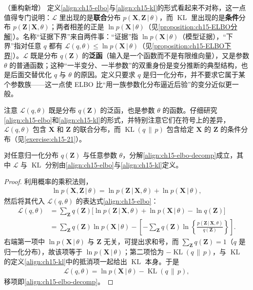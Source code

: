 \documentclass[../../main.tex]{subfiles}
\begin{document}
\begin{remark}（重构新增）
定义\eqref{align:ch15-elbo}与\eqref{align:ch15-kl}的形式看起来不对称，这一点值得专门说明：$\mathcal{L}$ 里出现的是\textbf{联合}分布 $p(\bm{X},\bm{Z}\,|\,\theta)$，而 $\operatorname{KL}$ 里出现的是\textbf{条件}分布 $p(\bm{Z}\,|\,\bm{X},\theta)$；两者相差的正是 $\ln p(\bm{X}\,|\,\theta)$（见\cref{proposition:ch15-ELBO分解}）。名称“证据下界”来自两件事：“证据”指 $\ln p(\bm{X}\,|\,\theta)$（模型证据），“下界”指对任意 $q$ 都有 $\mathcal{L}(q,\theta)\leqslant\ln p(\bm{X}\,|\,\theta)$（见\cref{proposition:ch15-ELBO下界}）。$\mathcal{L}$ 既是分布 $q(\bm{Z})$ 的\textbf{泛函}（输入是一个函数而不是有限维向量），又是参数 $\theta$ 的普通函数；这种“一半变分、一半参数”的双重身份是变分推断的典型结构，也是后面交替优化 $q$ 与 $\theta$ 的原因。定义只要求 $q$ 是归一化分布，并不要求它属于某个参数族——这一点使 ELBO 比“用一族参数化分布逼近后验”的变分近似更一般。
\end{remark}

注意 $\mathcal{L}(q,\theta)$ 既是分布 $q(\bm{Z})$ 的泛函，也是参数 $\theta$ 的函数。仔细研究\eqref{align:ch15-elbo}和\eqref{align:ch15-kl}的形式，并特别注意它们在符号上的差异，$\mathcal{L}(q,\theta)$ 包含 $\bm{X}$ 和 $\bm{Z}$ 的联合分布，而 $\operatorname{KL}(q\,\|\,p)$ 包含给定 $\bm{X}$ 的 $\bm{Z}$ 的条件分布（见\cref{exercise:ch15-21}）。

\begin{proposition}[ELBO 分解]\label{proposition:ch15-ELBO分解}
对任意归一化分布 $q(\bm{Z})$ 与任意参数 $\theta$，分解\eqref{align:ch15-elbo-decomp}成立，其中 $\mathcal{L}$ 与 $\operatorname{KL}$ 分别由\eqref{align:ch15-elbo}与\eqref{align:ch15-kl}定义。
\end{proposition}
\begin{proof}
利用概率的乘积法则，
\begin{align}
\ln p(\bm{X},\bm{Z}\,|\,\theta)=\ln p(\bm{Z}\,|\,\bm{X},\theta)+\ln p(\bm{X}\,|\,\theta),
\label{align:ch15-product-rule}
\end{align}
然后将其代入 $\mathcal{L}(q,\theta)$ 的表达式\eqref{align:ch15-elbo}：
\begin{align*}
\mathcal{L}(q,\theta)
&=\sum_{\bm{Z}}q(\bm{Z})\Big[\ln p(\bm{Z}\,|\,\bm{X},\theta)+\ln p(\bm{X}\,|\,\theta)-\ln q(\bm{Z})\Big]\\
&=\sum_{\bm{Z}}q(\bm{Z})\ln p(\bm{X}\,|\,\theta)
-\left[-\sum_{\bm{Z}}q(\bm{Z})\ln\!\left\{\frac{p(\bm{Z}\,|\,\bm{X},\theta)}{q(\bm{Z})}\right\}\right].
\end{align*}
右端第一项中 $\ln p(\bm{X}\,|\,\theta)$ 与 $\bm{Z}$ 无关，可提出求和号，而 $\sum_{\bm{Z}}q(\bm{Z})=1$（$q$ 是归一化分布），故该项等于 $\ln p(\bm{X}\,|\,\theta)$；第二项恰为 $-\operatorname{KL}(q\,\|\,p)$，与 $\operatorname{KL}$ 的定义\eqref{align:ch15-kl}中的抵消项一起给出 $\operatorname{KL}$ 本身。于是
\begin{align*}
\mathcal{L}(q,\theta)=\ln p(\bm{X}\,|\,\theta)-\operatorname{KL}\!\left(q\,\|\,p\right),
\end{align*}
移项即\eqref{align:ch15-elbo-decomp}。
\end{proof}
\end{document}

